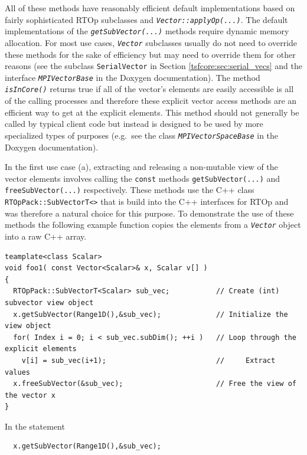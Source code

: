 {}\noindent{}All of these methods have reasonably efficient default implementations
based on fairly sophisticated RTOp subclasses and
\texttt{\textit{Vector::applyOp(\-...)}}.  The default implementations of the
\texttt{\textit{getSubVector(...)}} methods require dynamic memory allocation.
For most use cases, \texttt{\textit{Vector}} subclasses usually do not
need to override these methods for the sake of efficiency but may need
to override them for other reasons (see the subclass
\texttt{SerialVector} in Section \ref{tsfcore:sec:serial_vecs} and
the interface \texttt{\textit{MPI\-Vector\-Base}} in the Doxygen
documentation).  The method \texttt{\textit{isInCore()}} returns true
if all of the vector's elements are easily accessible is all of the
calling processes and therefore these explicit vector access methods
are an efficient way to get at the explicit elements.  This method
should not generally be called by typical client code but instead is
designed to be used by more specialized types of purposes (e.g.~see the
class \texttt{\textit{MPI\-Vector\-Space\-Base}} in the Doxygen
documentation).

In the first use case (a), extracting and releasing a non-mutable view of the
vector elements involves calling the \texttt{const} methods
\texttt{getSubVector(...)} and
\texttt{freeSubVector(...)} respectively.  These methods use the C++ class
\texttt{RTOpPack::\-SubVectorT<>} that is build into the C++ interfaces for RTOp
and was therefore a natural choice for this purpose.  To demonstrate
the use of these methods the following example function copies the
elements from a \texttt{\textit{Vector}} object into a raw C++ array.

{\scriptsize\begin{verbatim}
teamplate<class Scalar>
void foo1( const Vector<Scalar>& x, Scalar v[] )
{
  RTOpPack::SubVectorT<Scalar> sub_vec;           // Create (int) subvector view object
  x.getSubVector(Range1D(),&sub_vec);             // Initialize the view object
  for( Index i = 0; i < sub_vec.subDim(); ++i )   // Loop through the explicit elements
    v[i] = sub_vec(i+1);                          //     Extract values
  x.freeSubVector(&sub_vec);                      // Free the view of the vector x
}
\end{verbatim}}

{}\noindent{}In the statement

{\scriptsize\begin{verbatim}
  x.getSubVector(Range1D(),&sub_vec);
\end{verbatim}}

